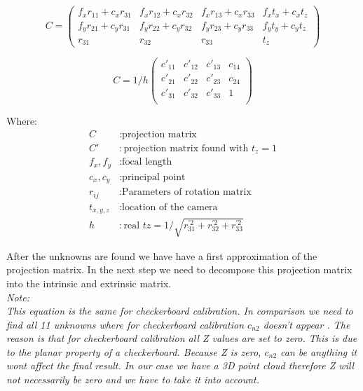 \documentclass[11pt,a4paper,titlepage,oneside]{report}
\begin{document}
\begin{equation}\label{eq:ext_int}
	C=
	\begin{pmatrix}
		f_xr_{11}+c_xr_{31} & f_xr_{12}+c_xr_{32} & f_xr_{13}+c_xr_{33} & f_xt_x+c_xt_z\\
		f_yr_{21}+c_yr_{31} & f_yr_{22}+c_yr_{32} & f_yr_{23}+c_yr_{33} & f_yt_y+c_yt_z\\
		r_{31} & r_{32} & r_{33} & t_z
	\end{pmatrix}
\end{equation}

\begin{equation}\label{eq:ext_int_scaled}
	C=1/h
	\begin{pmatrix}
		c'_{11} & c'_{12} & c'_{13} & c_{14}\\
		c'_{21} & c'_{22} & c'_{23} & c_{24}\\
		c'_{31} & c'_{32} & c'_{33} & 1\\
	\end{pmatrix}
\end{equation}

Where:
\begin{align*}
	C					&: \text{projection matrix}\\
	C'				&: \text{projection matrix found with $t_z=1$}\\
	f_x,f_y		&: \text{focal length}\\
	c_x,c_y		&: \text{principal point}\\
	r_{ij}		&: \text{Parameters of rotation matrix}\\
	t_{x,y,z}	&: \text{location of the camera}\\
	h					&: \text{real $tz=1/\sqrt{r_{31}^{'2}+r_{32}^{'2}+r_{33}^{'2}}$}
\end{align*}


After the unknowns are found we have have a first approximation of the projection matrix. In the next step we need to decompose this projection matrix into the intrinsic and extrinsic matrix.\\
\em
Note:\\
This equation is the same for checkerboard calibration. In comparison we need to find all 11 unknowns where for checkerboard calibration $c_{n2}$ doesn't appear \cite{Zhang}. The reason is that for checkerboard calibration all Z values are set to zero. This is due to the planar property of a checkerboard. Because Z is zero, $c_{n2}$ can be anything it wont affect the final result. In our case we have a 3D point cloud therefore Z will not necessarily be zero and we have to take it into account.
\normalfont
\end{document}
